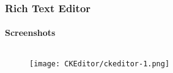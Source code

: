 \begin{frame}[fragile]
	\frametitle{Rich Text Editor}
	\framesubtitle{Screenshots}

	\begin{columns}[T]
		\begin{column}{.5\textwidth}
			\begin{figure}\vspace*{-0.4cm}
				\texttt{[image: CKEditor/ckeditor-1.png]}
			\end{figure}
		\end{column}
		\begin{column}{.5\textwidth}
		\end{column}
	\end{columns}

\end{frame}

